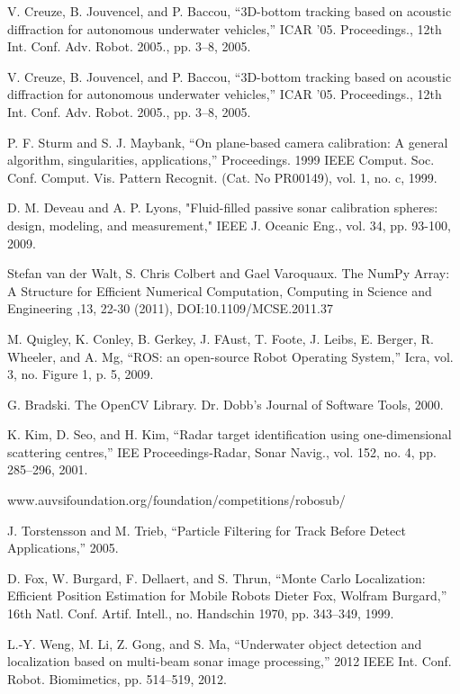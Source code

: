 \documentclass[a4paper]{IEEEtran}
\begin{document}
\begin{thebibliography}{1}
V. Creuze, B. Jouvencel, and P. Baccou, “3D-bottom tracking based on acoustic diffraction for autonomous underwater vehicles,” ICAR ’05. Proceedings., 12th Int. Conf. Adv. Robot. 2005., pp. 3–8, 2005.

V. Creuze, B. Jouvencel, and P. Baccou, “3D-bottom tracking based on acoustic diffraction for autonomous underwater vehicles,” ICAR ’05. Proceedings., 12th Int. Conf. Adv. Robot. 2005., pp. 3–8, 2005.

P. F. Sturm and S. J. Maybank, “On plane-based camera calibration: A general algorithm, singularities, applications,” Proceedings. 1999 IEEE Comput. Soc. Conf. Comput. Vis. Pattern Recognit. (Cat. No PR00149), vol. 1, no. c, 1999.

D. M. Deveau and A. P. Lyons, "Fluid-filled passive sonar calibration spheres: design, modeling, and measurement," IEEE J. Oceanic Eng., vol. 34, pp. 93-100, 2009.

Stefan van der Walt, S. Chris Colbert and Gael Varoquaux. The NumPy Array: A Structure for Efficient Numerical Computation, Computing in Science and Engineering ,13, 22-30 (2011), DOI:10.1109/MCSE.2011.37

M. Quigley, K. Conley, B. Gerkey, J. FAust, T. Foote, J. Leibs, E. Berger, R. Wheeler, and A. Mg, “ROS: an open-source Robot Operating System,” Icra, vol. 3, no. Figure 1, p. 5, 2009.

G. Bradski. The OpenCV Library. Dr. Dobb’s Journal of Software Tools, 2000.

K. Kim, D. Seo, and H. Kim, “Radar target identification using one-dimensional scattering centres,” IEE Proceedings-Radar, Sonar Navig., vol. 152, no. 4, pp. 285–296, 2001.

www.auvsifoundation.org/foundation/competitions/robosub/

J. Torstensson and M. Trieb, “Particle Filtering for Track Before Detect Applications,” 2005.

D. Fox, W. Burgard, F. Dellaert, and S. Thrun, “Monte Carlo Localization: Efficient Position Estimation for Mobile Robots Dieter Fox, Wolfram Burgard,” 16th Natl. Conf. Artif. Intell., no. Handschin 1970, pp. 343–349, 1999.

L.-Y. Weng, M. Li, Z. Gong, and S. Ma, “Underwater object detection and localization based on multi-beam sonar image processing,” 2012 IEEE Int. Conf. Robot. Biomimetics, pp. 514–519, 2012.

\end{thebibliography}
\end{document}
